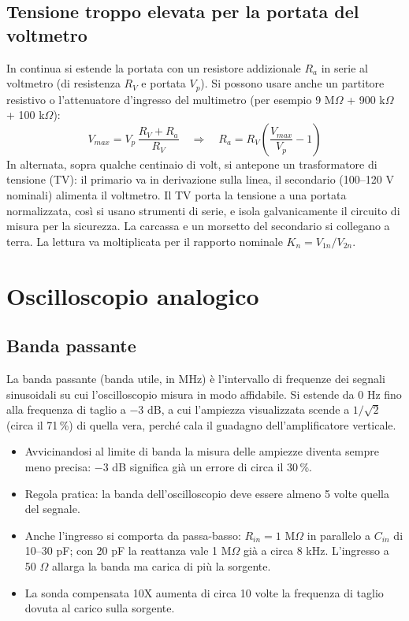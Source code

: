 \documentclass[11pt,a4paper]{article}
\begin{document}
\subsection*{Tensione troppo elevata per la portata del voltmetro}

In continua si estende la portata con un resistore addizionale $R_a$ in serie al voltmetro (di resistenza $R_V$ e portata $V_p$). Si possono usare anche un partitore resistivo o l'attenuatore d'ingresso del multimetro (per esempio 9 M$\Omega$ + 900 k$\Omega$ + 100 k$\Omega$):
\[
V_{max} = V_p\,\frac{R_V + R_a}{R_V} \quad\Rightarrow\quad R_a = R_V\left(\frac{V_{max}}{V_p} - 1\right)
\]
In alternata, sopra qualche centinaio di volt, si antepone un trasformatore di tensione (TV): il primario va in derivazione sulla linea, il secondario (100--120 V nominali) alimenta il voltmetro. Il TV porta la tensione a una portata normalizzata, così si usano strumenti di serie, e isola galvanicamente il circuito di misura per la sicurezza. La carcassa e un morsetto del secondario si collegano a terra. La lettura va moltiplicata per il rapporto nominale $K_n = V_{1n}/V_{2n}$.

\section*{Oscilloscopio analogico}

\subsection*{Banda passante}

La banda passante (banda utile, in MHz) è l'intervallo di frequenze dei segnali sinusoidali su cui l'oscilloscopio misura in modo affidabile. Si estende da 0 Hz fino alla frequenza di taglio a $-3$ dB, a cui l'ampiezza visualizzata scende a $1/\sqrt{2}$ (circa il 71\,\%) di quella vera, perché cala il guadagno dell'amplificatore verticale.
\begin{itemize}
\item Avvicinandosi al limite di banda la misura delle ampiezze diventa sempre meno precisa: $-3$ dB significa già un errore di circa il 30\,\%.
\item Regola pratica: la banda dell'oscilloscopio deve essere almeno 5 volte quella del segnale.
\item Anche l'ingresso si comporta da passa-basso: $R_{in} = 1$ M$\Omega$ in parallelo a $C_{in}$ di 10--30 pF; con 20 pF la reattanza vale 1 M$\Omega$ già a circa 8 kHz. L'ingresso a 50 $\Omega$ allarga la banda ma carica di più la sorgente.
\item La sonda compensata 10X aumenta di circa 10 volte la frequenza di taglio dovuta al carico sulla sorgente.
\end{itemize}
\end{document}
